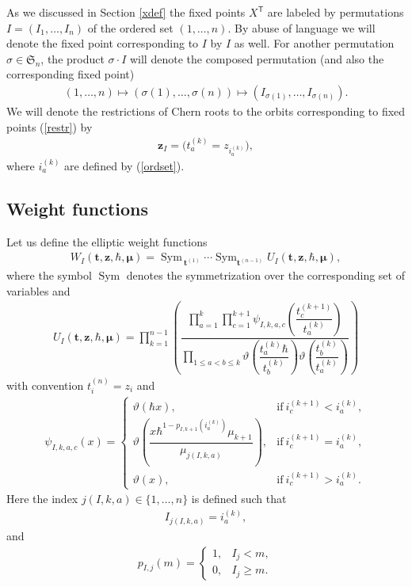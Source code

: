 \documentclass[pdftex]{sigma}
\DeclareMathOperator\Sym{Sym}
\newcommand{\bT}{\mathsf{T}}
\def\ttt{{\boldsymbol t}}
\def\zz{{\boldsymbol z}}
\def\mub{{\boldsymbol\mu}}
\let\thi\vartheta
\numberwithin{equation}{section}
\begin{document}
As we discussed in Section \ref{xdef} the fixed points $X^{\bT}$ are labeled by permutations $I=(I_1,\dots, I_n)$ of the ordered set $(1,\dots, n)$. By abuse of language we will denote the fixed point corresponding to $I$ by $I$ as well. For another permutation $\sigma \in \mathfrak{S}_n$, the product $\sigma\cdot I$ will denote the composed permutation (and also the corresponding fixed point)
\begin{gather*}
(1, \dots, n) \mapsto (\sigma (1), \dots, \sigma (n)) \mapsto (I_{\sigma (1)}, \dots, I_{\sigma (n)} ).
\end{gather*}
We  will denote the restrictions of Chern roots to the orbits corresponding to fixed points (\ref{restr}) by
\begin{gather} \label{fpres}
\zz_{I}=\big(t^{(k)}_{a}=z_{i^{(k)}_a}\big) ,
\end{gather}
where $i^{(k)}_a$ are defined by (\ref{ordset}).

\subsection{Weight functions}
Let us define the elliptic weight functions
\begin{gather} \label{WI2}
W_I(\ttt,\zz,\hbar,\mub) =\Sym_{\>\ttt^{(1)}} \cdots \Sym_{\ttt^{(n-1)}} U_I(\ttt,\zz,\hbar,\mub),
\end{gather}
where the symbol $\Sym$ denotes the symmetrization over the corresponding set of variables and
\begin{gather*}%
U_I(\ttt,\zz,\hbar,\mub) =\prod\limits_{k=1}^{n-1} \left(
\dfrac{\prod\limits_{a=1}^{k} \prod\limits_{c=1}^{k+1} \psi_{I,k,a,c} \left( \dfrac{t^{(k+1)}_c}{t^{(k)}_a} \right) }{\prod\limits_{1 \leq a<b \leq k } \thi \left( \dfrac{t^{(k)}_a \hbar}{t^{(k)}_b} \right) \thi \left( \dfrac{t^{(k)}_b}{t^{(k)}_a} \right) }\right)
\end{gather*}
with convention $t^{(n)}_{i}=z_{i}$ and
\begin{gather*}%
\psi_{I,k,a,c}(x) = \begin{cases}
 \thi(\hbar x) ,& \text{if} \ i^{(k+1)}_c<i^{(k)}_a,\\
 \displaystyle
 {\thi \left( \dfrac{x\hbar^{1 -p_{I,k+1}(i_a^{(k)})}
 \mu_{k+1} }{ \mu_{j(I,k,a)} } \right)} , &
 \text{if} \ i^{(k+1)}_c=i^{(k)}_a, \\
 \thi(x),& \text{if} \ i^{(k+1)}_c>i^{(k)}_a .
\end{cases}
\end{gather*}
Here the index $j(I,k,a) \in \{1, \dots, n \}$ is defined such that
\begin{gather*}
I_{j (I, k, a)} = i_a^{(k)},
\end{gather*}
and
\begin{gather} \label{p-function}
p_{I, j} (m) = \begin{cases}
 1, & I_j <m, \\
 0 , & I_j \geq m.
\end{cases}
\end{gather}
\end{document}
